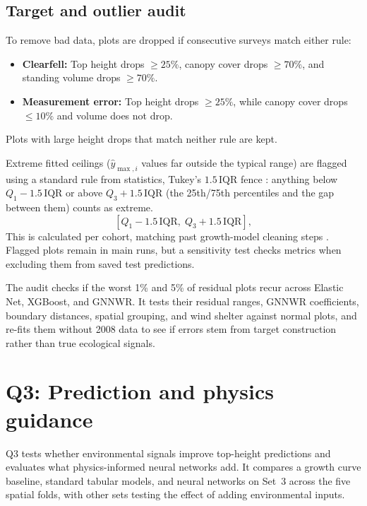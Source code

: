\documentclass[logo,msc,ai]{infthesis}           %
\begin{document}
\subsection*{Target and outlier audit}
To remove bad data, plots are dropped if consecutive surveys match either rule:
\begin{itemize}
\setlength\itemsep{2pt}
\item \textbf{Clearfell:} Top height drops $\ge 25\%$, canopy cover drops $\ge 70\%$, and standing volume drops $\ge 70\%$.
\item \textbf{Measurement error:} Top height drops $\ge 25\%$, while canopy cover drops $\le 10\%$ and volume does not drop.
\end{itemize}
Plots with large height drops that match neither rule are kept.

Extreme fitted ceilings ($\hat y_{\max,i}$ values far outside the typical range) are flagged using a standard rule from statistics, Tukey's $1.5\,\mathrm{IQR}$ fence %
: anything below $Q_1 - 1.5\,\mathrm{IQR}$ or above $Q_3 + 1.5\,\mathrm{IQR}$ (the 25th/75th percentiles and the gap between them) counts as extreme.
\begin{equation}
\left[Q_1 - 1.5\,\mathrm{IQR},\; Q_3 + 1.5\,\mathrm{IQR}\right],
\label{eq:tukey-fences}
\end{equation}
This is calculated per cohort, matching past growth-model cleaning steps %
. Flagged plots remain in main runs, but a sensitivity test checks metrics when excluding them from saved test predictions.

The audit checks if the worst 1\% and 5\% of residual plots recur across Elastic Net, XGBoost, and GNNWR. It tests their residual ranges, GNNWR coefficients, boundary distances, spatial grouping, and wind shelter against normal plots, and re-fits them without 2008 data to see if errors stem from target construction rather than true ecological signals.

\section{Q3: Prediction and physics guidance}

Q3 tests whether environmental signals improve top-height predictions and evaluates what physics-informed neural networks add. It compares a growth curve baseline, standard tabular models, and neural networks on Set~3 across the five spatial folds, with other sets testing the effect of adding environmental inputs.
\end{document}
